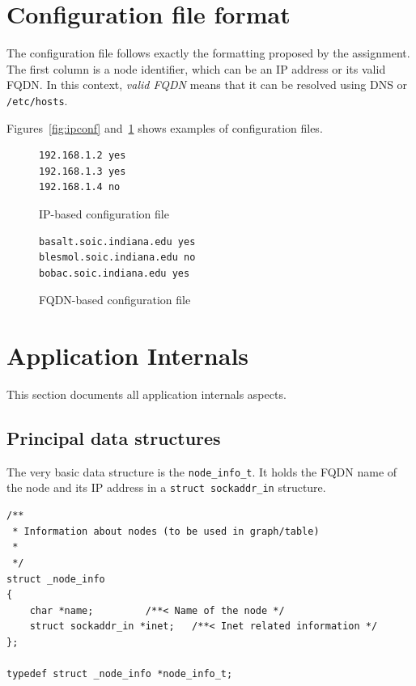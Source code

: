 \documentclass[10pt]{extarticle}
\begin{document}
\section{Configuration file format}

The configuration file follows exactly the formatting proposed by the
assignment. The first column is a node identifier, which can be an IP address or
its valid FQDN. In this context, \emph{valid FQDN} means that it can be resolved
using DNS or \texttt{/etc/hosts}.

Figures~\ref{fig:ipconf} and~\ref{fig:fqdnconf} shows examples of configuration files.
\begin{figure}[!h]
\begin{minipage}[t]{0.4\textwidth}
\begin{Verbatim}[frame=single,framesep=10mm]
192.168.1.2 yes
192.168.1.3 yes
192.168.1.4 no
\end{Verbatim}
\caption{IP-based configuration file}
\label{fig:ipconf}
\end{minipage}
\hfill
\begin{minipage}[t]{0.4\textwidth}
\begin{Verbatim}[frame=single,framesep=10mm]
basalt.soic.indiana.edu yes
blesmol.soic.indiana.edu no
bobac.soic.indiana.edu yes
\end{Verbatim}
\caption{FQDN-based configuration file}
\label{fig:fqdnconf}
\end{minipage}
\end{figure}

\newpage
\section{Application Internals}

This section documents all application internals aspects.

\subsection{Principal data structures}

The very basic data structure is the \texttt{node\_info\_t}. It holds the FQDN
name of the node and its IP address in a \texttt{struct sockaddr\_in}
structure.

\begin{lstlisting}
/**
 * Information about nodes (to be used in graph/table)
 * 
 */
struct _node_info
{
    char *name;			/**< Name of the node */
    struct sockaddr_in *inet;	/**< Inet related information */
};

typedef struct _node_info *node_info_t;
\end{lstlisting}
\end{document}

